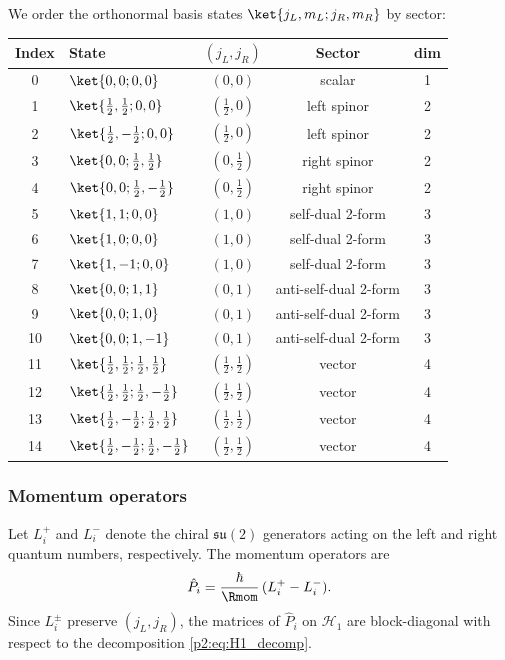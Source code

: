 \documentclass[11pt,a4paper]{article}
\begin{document}
We order the orthonormal basis states $\ket{j_L,m_L;j_R,m_R}$ by sector:
\begin{center}
\renewcommand{\arraystretch}{1.15}
\begin{tabular}{clccc}
\toprule
Index & State & $(j_L,j_R)$ & Sector & dim \\
\midrule
0  & $\ket{0,0;0,0}$ & $(0,0)$ & scalar & 1 \\
1  & $\ket{\tfrac12,\tfrac12;0,0}$ & $(\tfrac12,0)$ & left spinor & 2 \\
2  & $\ket{\tfrac12,-\tfrac12;0,0}$ & $(\tfrac12,0)$ & left spinor & 2 \\
3  & $\ket{0,0;\tfrac12,\tfrac12}$ & $(0,\tfrac12)$ & right spinor & 2 \\
4  & $\ket{0,0;\tfrac12,-\tfrac12}$ & $(0,\tfrac12)$ & right spinor & 2 \\
5  & $\ket{1,1;0,0}$ & $(1,0)$ & self-dual 2-form & 3 \\
6  & $\ket{1,0;0,0}$ & $(1,0)$ & self-dual 2-form & 3 \\
7  & $\ket{1,-1;0,0}$ & $(1,0)$ & self-dual 2-form & 3 \\
8  & $\ket{0,0;1,1}$ & $(0,1)$ & anti-self-dual 2-form & 3 \\
9  & $\ket{0,0;1,0}$ & $(0,1)$ & anti-self-dual 2-form & 3 \\
10 & $\ket{0,0;1,-1}$ & $(0,1)$ & anti-self-dual 2-form & 3 \\
11 & $\ket{\tfrac12,\tfrac12;\tfrac12,\tfrac12}$ & $(\tfrac12,\tfrac12)$ & vector & 4 \\
12 & $\ket{\tfrac12,\tfrac12;\tfrac12,-\tfrac12}$ & $(\tfrac12,\tfrac12)$ & vector & 4 \\
13 & $\ket{\tfrac12,-\tfrac12;\tfrac12,\tfrac12}$ & $(\tfrac12,\tfrac12)$ & vector & 4 \\
14 & $\ket{\tfrac12,-\tfrac12;\tfrac12,-\tfrac12}$ & $(\tfrac12,\tfrac12)$ & vector & 4 \\
\bottomrule
\end{tabular}
\end{center}

\subsubsection{Momentum operators}
\label{p2:app:momentum_matrices}

Let $L_i^+$ and $L_i^-$ denote the chiral $\mathfrak{su}(2)$ generators acting on the left and right
quantum numbers, respectively. The momentum operators are
\begin{equation}
\label{p2:eq:P_def_app}
\hat{P}_i=\frac{\hbar}{\Rmom}\,(L_i^+ - L_i^-).
\end{equation}
Since $L_i^\pm$ preserve $(j_L,j_R)$, the matrices of $\hat{P}_i$ on $\mathcal{H}_1$ are block-diagonal
with respect to the decomposition \eqref{p2:eq:H1_decomp}.
\end{document}
